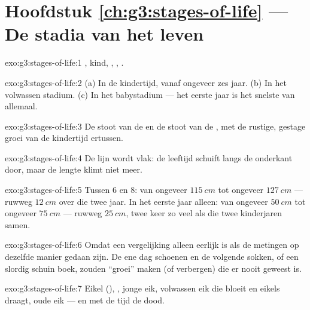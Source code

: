 \section*{Hoofdstuk \ref{ch:g3:stages-of-life} --- De stadia van het leven}

\begin{solution}{exo:g3:stages-of-life:1}
, kind, , , .
\end{solution}

\begin{solution}{exo:g3:stages-of-life:2}
(a) In de kindertijd, vanaf ongeveer zes jaar. (b) In het volwassen
stadium. (c) In het babystadium --- het eerste jaar is het snelste van allemaal.
\end{solution}

\begin{solution}{exo:g3:stages-of-life:3}
De stoot van de  en de stoot van de , met de rustige, gestage
groei van de kindertijd ertussen.
\end{solution}

\begin{solution}{exo:g3:stages-of-life:4}
De lijn wordt vlak: de leeftijd schuift langs de onderkant door, maar
de lengte klimt niet meer.
\end{solution}

\begin{solution}{exo:g3:stages-of-life:5}
Tussen $6$ en $8$: van ongeveer $\qty{115}{cm}$ tot ongeveer
$\qty{127}{cm}$ --- ruwweg $\qty{12}{cm}$ over die twee jaar. In het
eerste jaar alleen: van ongeveer $\qty{50}{cm}$ tot ongeveer
$\qty{75}{cm}$ --- ruwweg $\qty{25}{cm}$, twee keer zo veel als die
twee kinderjaren samen.
\end{solution}

\begin{solution}{exo:g3:stages-of-life:6}
Omdat een vergelijking alleen eerlijk is als de metingen op dezelfde
manier gedaan zijn. De ene dag schoenen en de volgende sokken, of een
slordig schuin boek, zouden ``groei'' maken (of verbergen) die er
nooit geweest is.
\end{solution}

\begin{solution}{exo:g3:stages-of-life:7}
Eikel (), , jonge eik, volwassen eik die bloeit en
eikels draagt, oude eik --- en met de tijd de dood.
\end{solution}

